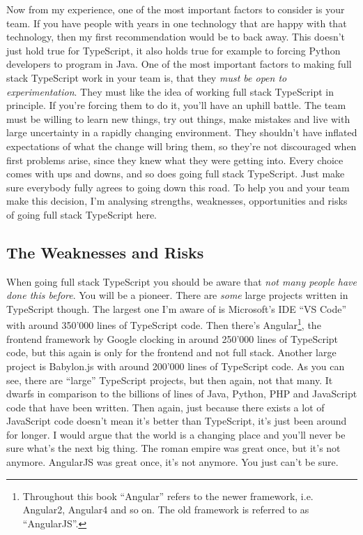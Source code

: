 \documentclass[12pt,a4paper]{report}
\begin{document}
Now from my experience, one of the most important factors to consider is your team. If you have people with years in one technology that are happy with that technology, then my first recommendation would be to back away. This doesn't just hold true for TypeScript, it also holds true for example to forcing Python developers to program in Java. One of the most important factors to making full stack TypeScript work in your team is, that they \textit{must be open to experimentation}. They must like the idea of working full stack TypeScript in principle. If you're forcing them to do it, you'll have an uphill battle. The team must be willing to learn new things, try out things, make mistakes and live with large uncertainty in a rapidly changing environment. They shouldn't have inflated expectations of what the change will bring them, so they're not discouraged when first problems arise, since they knew what they were getting into. Every choice comes with ups and downs, and so does going full stack TypeScript. Just make sure everybody fully agrees to going down this road. To help you and your team make this decision, I'm analysing strengths, weaknesses, opportunities and risks of going full stack TypeScript here.

\subsection{The Weaknesses and Risks}

When going full stack TypeScript you should be aware that \textit{not many people have done this before}. You will be a pioneer. There are \textit{some} large projects written in TypeScript though. The largest one I'm aware of is Microsoft's IDE ``VS Code'' with around 350'000 lines of TypeScript code. Then there's Angular\footnote{Throughout this book ``Angular'' refers to the newer framework, i.e. Angular2, Angular4 and so on. The old framework is referred to as ``AngularJS''.}, the frontend framework by Google clocking in around 250'000 lines of TypeScript code, but this again is only for the frontend and not full stack. Another large project is Babylon.js with around 200'000 lines of TypeScript code. As you can see, there are ``large'' TypeScript projects, but then again, not that many. It dwarfs in comparison to the billions of lines of Java, Python, PHP and JavaScript code that have been written. Then again, just because there exists a lot of JavaScript code doesn't mean it's better than TypeScript, it's just been around for longer. I would argue that the world is a changing place and you'll never be sure what's the next big thing. The roman empire was great once, but it's not anymore. AngularJS was great once, it's not anymore. You just can't be sure.
\end{document}
